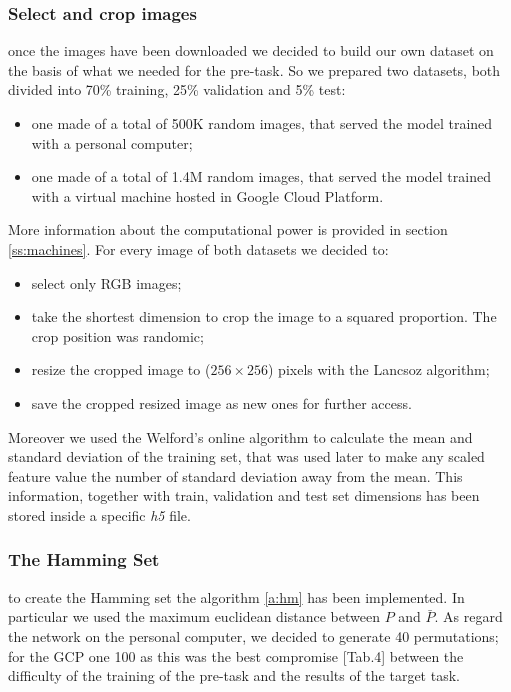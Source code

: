 \subsubsection{Select and crop images}\label{sss:select_crop_image}
once the images have been downloaded we decided to build our own dataset on the basis of what we needed for the pre-task. So we prepared two datasets, both divided into 70\% training, 25\% validation and 5\% test:
\begin{itemize}
    \item one made of a total of 500K random images, that served the model trained with a personal computer;
    \item one made of a total of 1.4M random images, that served the model trained with a virtual machine hosted in Google Cloud Platform.
\end{itemize}
More information about the computational power is provided in section \ref{ss:machines}. For every image of both datasets we decided to:
\begin{itemize}
    \item select only RGB images;
    \item take the shortest dimension to crop the image to a squared proportion. The crop position was randomic;
    \item resize the cropped image to ($256 \times 256$) pixels with the Lancsoz algorithm;
    \item save the cropped resized image as new ones for further access.
\end{itemize}
Moreover we used the Welford's online algorithm \cite{Welford_online_algorithm} to calculate the mean and standard deviation of the training set, that was used later to make any scaled feature value the number of standard deviation away from the mean. This information, together with train, validation and test set dimensions has been stored inside a specific \emph{h5} file.

\subsubsection{The Hamming Set}
to create the Hamming set the algorithm \ref{a:hm} has been implemented. In particular we used the maximum euclidean distance between $P$ and $\bar{P}$. As regard the network on the personal computer, we decided to generate 40 permutations; for the GCP one 100 as this was the best compromise \cite{Noroozi_2016}[Tab.4] between the difficulty of the training of the pre-task and the results of the target task.

